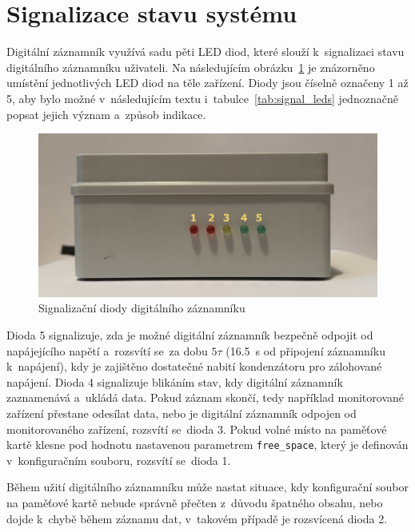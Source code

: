 \section{Signalizace stavu systému}
\label{signalizace_stavu_systemu}
Digitální záznamník využívá sadu pěti LED diod, které slouží k~signalizaci stavu digitálního záznamníku uživateli. Na následujícím obrázku~\ref{fig:signal-diodes} je znázorněno umístění jednotlivých LED diod na těle zařízení. Diody jsou číselně označeny 1 až 5, aby bylo možné v~následujícím textu i~tabulce~\ref{tab:signal_leds} jednoznačně popsat jejich význam a~způsob indikace.

\begin{figure}[h]
    \centering
    \includegraphics[width=1.00\textwidth]{obrazky-figures/leds-resized-marked.jpg}
    
    \caption{Signalizační diody digitálního záznamníku}
    \label{fig:signal-diodes}
\end{figure}

Dioda 5 signalizuje, zda je možné digitální záznamník bezpečně odpojit od napájejícího napětí a~rozsvítí se~za dobu $5\tau$ (\SI{16.5}{\second} od připojení záznamníku k~napájení), kdy je zajištěno dostatečné nabití kondenzátoru pro zálohované napájení. Dioda 4 signalizuje blikáním stav, kdy digitální záznamník zaznamenává a~ukládá data. Pokud záznam skončí, tedy například monitorované zařízení přestane odesílat data, nebo je digitální záznamník odpojen od monitorovaného zařízení, rozsvítí se~dioda 3. Pokud volné místo na paměťové kartě klesne pod hodnotu nastavenou parametrem \texttt{free\_space}, který je definován v~konfiguračním souboru, rozsvítí se~dioda 1.

Během užití digitálního záznamníku může nastat situace, kdy konfigurační soubor na paměťové kartě nebude správně přečten z~důvodu špatného obsahu, nebo dojde k~chybě během záznamu dat, v~takovém případě je rozsvícená dioda 2.



